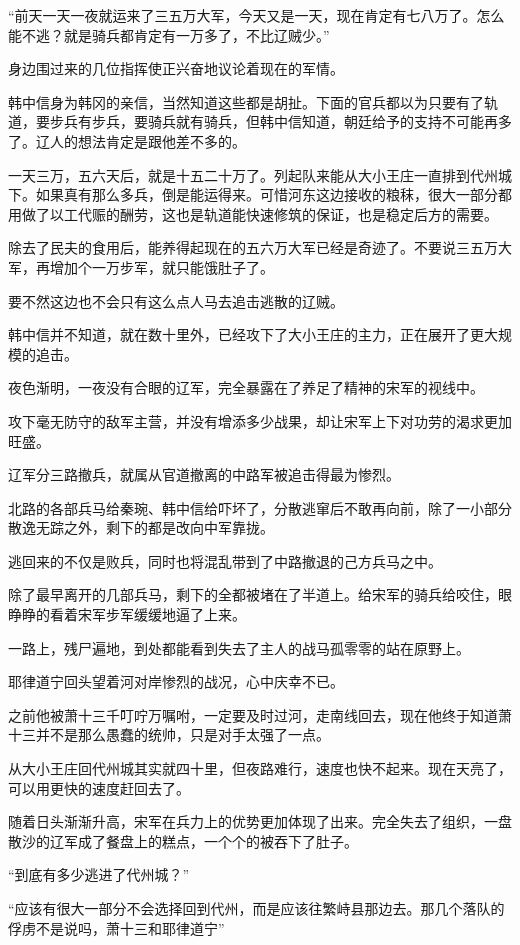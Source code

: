 “前天一天一夜就运来了三五万大军，今天又是一天，现在肯定有七八万了。怎么能不逃？就是骑兵都肯定有一万多了，不比辽贼少。”

身边围过来的几位指挥使正兴奋地议论着现在的军情。

韩中信身为韩冈的亲信，当然知道这些都是胡扯。下面的官兵都以为只要有了轨道，要步兵有步兵，要骑兵就有骑兵，但韩中信知道，朝廷给予的支持不可能再多了。辽人的想法肯定是跟他差不多的。

一天三万，五六天后，就是十五二十万了。列起队来能从大小王庄一直排到代州城下。如果真有那么多兵，倒是能运得来。可惜河东这边接收的粮秣，很大一部分都用做了以工代赈的酬劳，这也是轨道能快速修筑的保证，也是稳定后方的需要。

除去了民夫的食用后，能养得起现在的五六万大军已经是奇迹了。不要说三五万大军，再增加个一万步军，就只能饿肚子了。

要不然这边也不会只有这么点人马去追击逃散的辽贼。

韩中信并不知道，就在数十里外，已经攻下了大小王庄的主力，正在展开了更大规模的追击。

夜色渐明，一夜没有合眼的辽军，完全暴露在了养足了精神的宋军的视线中。

攻下毫无防守的敌军主营，并没有增添多少战果，却让宋军上下对功劳的渴求更加旺盛。

辽军分三路撤兵，就属从官道撤离的中路军被追击得最为惨烈。

北路的各部兵马给秦琬、韩中信给吓坏了，分散逃窜后不敢再向前，除了一小部分散逸无踪之外，剩下的都是改向中军靠拢。

逃回来的不仅是败兵，同时也将混乱带到了中路撤退的己方兵马之中。

除了最早离开的几部兵马，剩下的全都被堵在了半道上。给宋军的骑兵给咬住，眼睁睁的看着宋军步军缓缓地逼了上来。

一路上，残尸遍地，到处都能看到失去了主人的战马孤零零的站在原野上。

耶律道宁回头望着河对岸惨烈的战况，心中庆幸不已。

之前他被萧十三千叮咛万嘱咐，一定要及时过河，走南线回去，现在他终于知道萧十三并不是那么愚蠢的统帅，只是对手太强了一点。

从大小王庄回代州城其实就四十里，但夜路难行，速度也快不起来。现在天亮了，可以用更快的速度赶回去了。

随着日头渐渐升高，宋军在兵力上的优势更加体现了出来。完全失去了组织，一盘散沙的辽军成了餐盘上的糕点，一个个的被吞下了肚子。

“到底有多少逃进了代州城？”

“应该有很大一部分不会选择回到代州，而是应该往繁峙县那边去。那几个落队的俘虏不是说吗，萧十三和耶律道宁”

